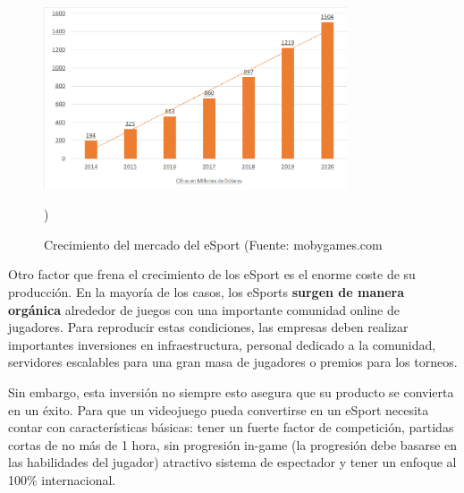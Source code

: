 \begin{figure}[h]
    \centering
    \includegraphics[width=0.8\textwidth]{images/estadodelarte/mercado/crecimiento-esport}
    \caption{Crecimiento del mercado del eSport (Fuente: mobygames.com})
    \label{crecimiento-esport}
\end{figure}

Otro factor que frena el crecimiento de los eSport es el enorme coste de su producción. En la mayoría de los casos, los eSports \textbf{surgen de manera orgánica} alrededor de juegos con una importante comunidad online de jugadores. Para reproducir estas condiciones, las empresas deben realizar importantes inversiones en infraestructura, personal dedicado a la comunidad, servidores escalables para una gran masa de jugadores o premios para los torneos. 

Sin embargo, esta inversión no siempre esto asegura que su producto se convierta en un éxito. Para que un videojuego pueda convertirse en un eSport necesita contar con características básicas: tener un fuerte factor de competición, partidas cortas de no más de 1 hora, sin progresión in-game (la progresión debe basarse en las habilidades del jugador) atractivo sistema de espectador y tener un enfoque al 100\% internacional.

